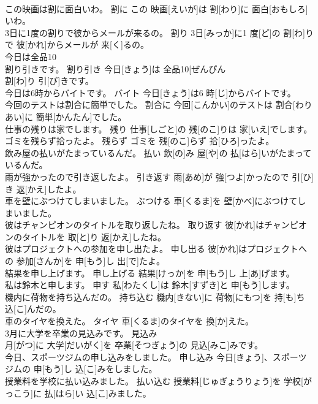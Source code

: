 \documentclass[8pt]{extreport}
\begin{document}
\begin{CJK}{UTF8}{min}
\\	この映画は割に面白いわ。	割に	この 映画[えいが]は 割[わり]に 面白[おもしろ]いわ。	
\\	3日に1度の割りで彼からメールが来るの。	割り	3日[みっか]に1 度[ど]の 割[わ]りで 彼[かれ]からメールが 来[く]るの。	
\\	今日は全品10
\\	割り引きです。	割り引き	今日[きょう]は 全品10[ぜんぴん 
\\	割[わ]り 引[び]きです。	
\\	今日は6時からバイトです。	バイト	今日[きょう]は6 時[じ]からバイトです。	
\\	今回のテストは割合に簡単でした。	割合に	今回[こんかい]のテストは 割合[わりあい]に 簡単[かんたん]でした。	
\\	仕事の残りは家でします。	残り	仕事[しごと]の 残[のこ]りは 家[いえ]でします。	
\\	ゴミを残らず拾ったよ。	残らず	ゴミを 残[のこ]らず 拾[ひろ]ったよ。	
\\	飲み屋の払いがたまっているんだ。	払い	飲[の]み 屋[や]の 払[はら]いがたまっているんだ。	
\\	雨が強かったので引き返したよ。	引き返す	雨[あめ]が 強[つよ]かったので 引[ひ]き 返[かえ]したよ。	
\\	車を壁にぶつけてしまいました。	ぶつける	車[くるま]を 壁[かべ]にぶつけてしまいました。	
\\	彼はチャンピオンのタイトルを取り返したね。	取り返す	彼[かれ]はチャンピオンのタイトルを 取[と]り 返[かえ]したね。	
\\	彼はプロジェクトへの参加を申し出たよ。	申し出る	彼[かれ]はプロジェクトへの 参加[さんか]を 申[もう]し 出[で]たよ。	
\\	結果を申し上げます。	申し上げる	結果[けっか]を 申[もう]し 上[あ]げます。	
\\	私は鈴木と申します。	申す	私[わたくし]は 鈴木[すずき]と 申[もう]します。	
\\	機内に荷物を持ち込んだの。	持ち込む	機内[きない]に 荷物[にもつ]を 持[も]ち 込[こ]んだの。	
\\	車のタイヤを換えた。	タイヤ	車[くるま]のタイヤを 換[か]えた。	
\\	3月に大学を卒業の見込みです。	見込み	
\\	月[がつ]に 大学[だいがく]を 卒業[そつぎょう]の 見込[みこ]みです。	
\\	今日、スポーツジムの申し込みをしました。	申し込み	今日[きょう]、スポーツジムの 申[もう]し 込[こ]みをしました。	
\\	授業料を学校に払い込みました。	払い込む	授業料[じゅぎょうりょう]を 学校[がっこう]に 払[はら]い 込[こ]みました。	

\end{CJK}
\end{document}
